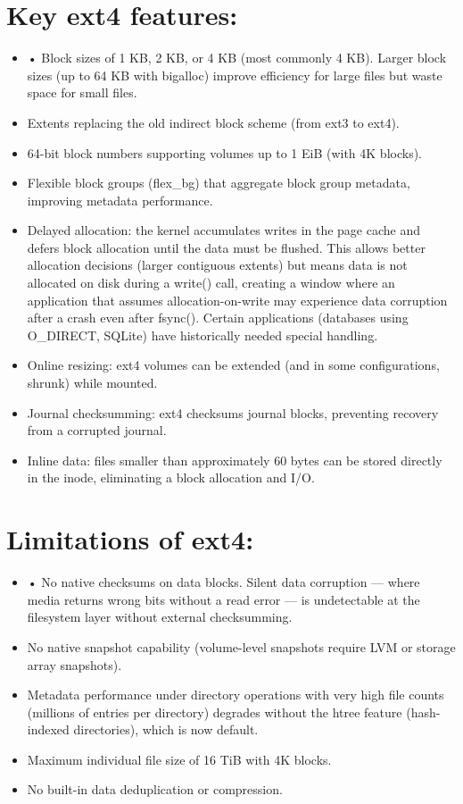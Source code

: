\section{Key ext4 features:}
\begin{itemize}
  \item • Block sizes of 1 KB, 2 KB, or 4 KB (most commonly 4 KB). Larger block sizes (up to 64 KB with bigalloc) improve efficiency for large files but waste space for small files.
  \item Extents replacing the old indirect block scheme (from ext3 to ext4).
  \item 64-bit block numbers supporting volumes up to 1 EiB (with 4K blocks).
  \item Flexible block groups (flex\_bg) that aggregate block group metadata, improving metadata performance.
  \item Delayed allocation: the kernel accumulates writes in the page cache and defers block allocation until the data must be flushed. This allows better allocation decisions (larger contiguous extents) but means data is not allocated on disk during a write() call, creating a window where an application that assumes allocation-on-write may experience data corruption after a crash even after fsync(). Certain applications (databases using O\_DIRECT, SQLite) have historically needed special handling.
  \item Online resizing: ext4 volumes can be extended (and in some configurations, shrunk) while mounted.
  \item Journal checksumming: ext4 checksums journal blocks, preventing recovery from a corrupted journal.
  \item Inline data: files smaller than approximately 60 bytes can be stored directly in the inode, eliminating a block allocation and I/O.
\end{itemize}

\section{Limitations of ext4:}
\begin{itemize}
  \item • No native checksums on data blocks. Silent data corruption --- where media returns wrong bits without a read error --- is undetectable at the filesystem layer without external checksumming.
  \item No native snapshot capability (volume-level snapshots require LVM or storage array snapshots).
  \item Metadata performance under directory operations with very high file counts (millions of entries per directory) degrades without the htree feature (hash-indexed directories), which is now default.
  \item Maximum individual file size of 16 TiB with 4K blocks.
  \item No built-in data deduplication or compression.
\end{itemize}

